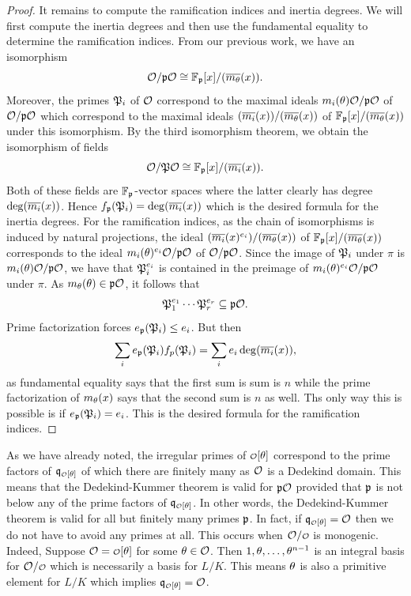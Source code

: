\begin{proof}
      It remains to compute the ramification indices and inertia degrees. We will first compute the inertia degrees and then use the fundamental equality to determine the ramification indices. From our previous work, we have an isomorphism
      \[
        \mathcal{O}/\mathfrak{p}\mathcal{O} \cong \mathbb{F}_{\mathfrak{p}}[x]/(\overline{m_{\theta}}(x)).
      \]
      Moreover, the primes \(\mathfrak{P}_{i}\) of \(\mathcal{O}\) correspond to the maximal ideals \(m_{i}(\theta)\mathcal{O}/\mathfrak{p}\mathcal{O}\) of \(\mathcal{O}/\mathfrak{p}\mathcal{O}\) which correspond to the maximal ideals \((\overline{m_{i}}(x))/(\overline{m_{\theta}}(x))\) of \(\mathbb{F}_{\mathfrak{p}}[x]/(\overline{m_{\theta}}(x))\) under this isomorphism. By the third isomorphism theorem, we obtain the isomorphism of fields
      \[
        \mathcal{O}/\mathfrak{P}\mathcal{O} \cong \mathbb{F}_{\mathfrak{p}}[x]/(\overline{m_{i}}(x)).
      \]
      Both of these fields are \(\mathbb{F}_{\mathfrak{p}}\)-vector spaces where the latter clearly has degree \(\deg(\overline{m_{i}}(x))\). Hence \(f_{\mathfrak{p}}(\mathfrak{P}_{i}) = \deg(\overline{m_{i}}(x))\) which is the desired formula for the inertia degrees. For the ramification indices, as the chain of isomorphisms is induced by natural projections, the ideal \((\overline{m_{i}}(x)^{e_{i}})/(\overline{m_{\theta}}(x))\) of \(\mathbb{F}_{\mathfrak{p}}[x]/(\overline{m_{\theta}}(x))\) corresponds to the ideal \(m_{i}(\theta)^{e_{i}}\mathcal{O}/\mathfrak{p}\mathcal{O}\) of \(\mathcal{O}/\mathfrak{p}\mathcal{O}\). Since the image of \(\mathfrak{P}_{i}\) under \(\pi\) is \(m_{i}(\theta)\mathcal{O}/\mathfrak{p}\mathcal{O}\), we have that \(\mathfrak{P}_{i}^{e_{i}}\) is contained in the preimage of \(m_{i}(\theta)^{e_{i}}\mathcal{O}/\mathfrak{p}\mathcal{O}\) under \(\pi\). As \(m_{\theta}(\theta) \in \mathfrak{p}\mathcal{O}\), it follows that
      \[
        \mathfrak{P}_{1}^{e_{1}} \cdots \mathfrak{P}_{r}^{e_{r}} \subseteq \mathfrak{p}\mathcal{O}.
      \]
      Prime factorization forces \(e_{\mathfrak{p}}(\mathfrak{P}_{i}) \le e_{i}\). But then
      \[
        \sum_{i}e_{\mathfrak{p}}(\mathfrak{P}_{i})f_{p}(\mathfrak{P}_{i}) = \sum_{i}e_{i}\deg(\overline{m_{i}}(x)),
      \]
      as fundamental equality says that the first sum is sum is \(n\) while the prime factorization of \(m_{\theta}(x)\) says that the second sum is \(n\) as well. Ths only way this is possible is if \(e_{\mathfrak{p}}(\mathfrak{P}_{i}) = e_{i}\). This is the desired formula for the ramification indices.
    \end{proof}

    As we have already noted, the irregular primes of \(\smc{O}[\t]\) correspond to the prime factors of \(\mf{q}_{\smc{O}[\t]}\) of which there are finitely many as \(\mathcal{O}\) is a Dedekind domain. This means that the Dedekind-Kummer theorem is valid for \(\mathfrak{p}\mathcal{O}\) provided that \(\mathfrak{p}\) is not below any of the prime factors of \(\mf{q}_{\smc{O}[\t]}\). In other words, the Dedekind-Kummer theorem is valid for all but finitely many primes \(\mathfrak{p}\). In fact, if \(\mf{q}_{\smc{O}[\t]} = \mc{O}\) then we do not have to avoid any primes at all. This occurs when \(\mc{O}/\smc{O}\) is monogenic. Indeed, Suppose \(\mc{O} = \smc{O}[\t]\) for some \(\theta \in \mathcal{O}\). Then \(1,\theta,\ldots,\theta^{n-1}\) is an integral basis for \(\mc{O}/\smc{O}\) which is necessarily a basis for \(L/K\). This means \(\theta\) is also a primitive element for \(L/K\) which implies \(\mf{q}_{\smc{O}[\t]} = \mc{O}\).

